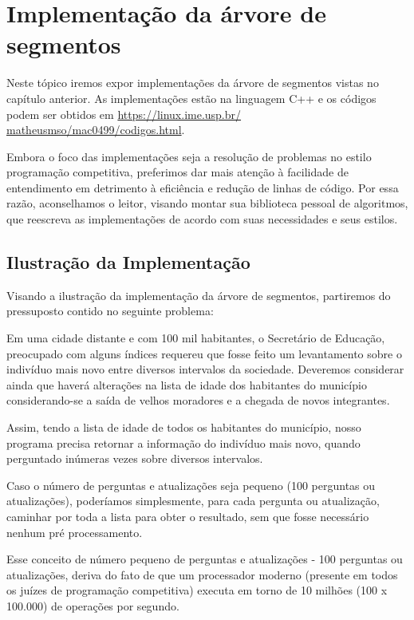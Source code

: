\chapter{Implementação da árvore de segmentos}
\label{cap:implementacao-ii}

Neste tópico iremos expor implementações da árvore de segmentos vistas no capítulo anterior. As implementações estão na linguagem C++ e os códigos podem ser obtidos em \url{https://linux.ime.usp.br/ matheusmso/mac0499/codigos.html}.

Embora o foco das implementações seja a resolução de problemas no estilo programação competitiva, preferimos dar mais atenção à facilidade de entendimento em detrimento à eficiência e redução de linhas de código. Por essa razão, aconselhamos o leitor, visando montar sua biblioteca pessoal de algoritmos, que reescreva as implementações de acordo com suas necessidades e seus estilos.


\section{Ilustração da Implementação}
Visando a ilustração da implementação da árvore de segmentos, partiremos do pressuposto contido no seguinte problema:

Em uma cidade distante e com 100 mil habitantes, o Secretário de Educação, preocupado com alguns índices requereu que fosse feito um levantamento sobre o indivíduo mais novo entre diversos intervalos da sociedade. Deveremos considerar ainda que haverá alterações na lista de idade dos habitantes do município considerando-se a saída de velhos moradores e a chegada de novos integrantes.

Assim, tendo a lista de idade de todos os habitantes do município, nosso programa precisa retornar a informação do indivíduo mais novo, quando perguntado inúmeras vezes sobre diversos intervalos.

Caso o número de perguntas e atualizações seja pequeno (100 perguntas ou atualizações), poderíamos simplesmente, para cada pergunta ou atualização, caminhar por toda a lista para obter o resultado, sem que fosse necessário nenhum pré processamento.

Esse conceito de número pequeno de perguntas e atualizações - 100 perguntas ou atualizações, deriva do fato de que um processador moderno (presente em todos os juízes de programação competitiva) executa em torno de 10 milhões (100 x 100.000) de operações por segundo.

